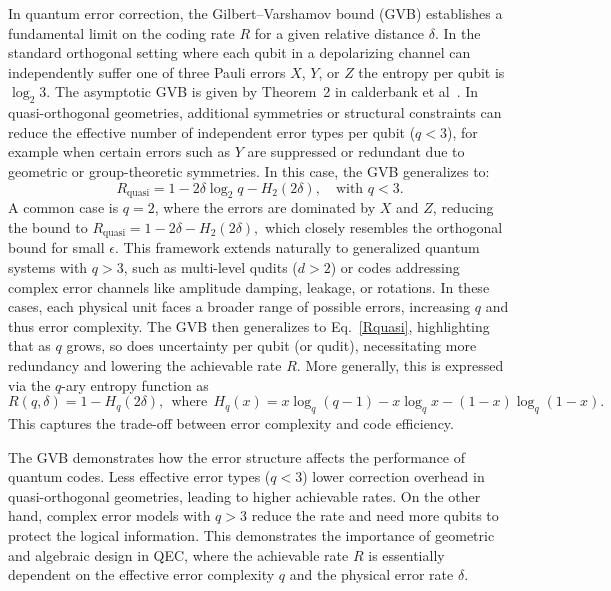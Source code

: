 \documentclass{iopjournal}
\theoremstyle{thmstyleone}%
\theoremstyle{thmstyletwo}%
\theoremstyle{thmstylethree}%
\begin{document}
In quantum error correction, the Gilbert–Varshamov bound (GVB) establishes a fundamental limit on the coding rate \(R\) for a given relative distance \(\delta\). In the standard orthogonal setting where each qubit in a depolarizing channel can independently suffer one of three Pauli errors \(X\), \(Y\), or \(Z\) the entropy per qubit is \(\log_2 3\). The asymptotic GVB is given by Theorem~2 in calderbank et al~\cite{Calderbank1997quantum}. %
In quasi-orthogonal geometries, additional symmetries or structural constraints can reduce the effective number of independent error types per qubit (\(q < 3\)), for example when certain errors such as \(Y\) are suppressed or redundant due to geometric or group-theoretic symmetries.
In this case, the GVB generalizes to:
\begin{equation}
R_{\text{quasi}} = 1 - 2\delta \log_2 q - H_2(2\delta), \quad \text{with } q < 3.\label{Rquasi}
\end{equation}
A common case is \( q = 2 \), where the errors are dominated by \( X \) and \( Z \), reducing the bound to
\(
R_{\text{quasi}} = 1 - 2\delta - H_2(2\delta),
\)
which closely resembles the orthogonal bound for small \(\epsilon\). This framework extends naturally to generalized quantum systems with \( q > 3 \), such as multi-level qudits (\( d > 2 \)) or codes addressing complex error channels like amplitude damping, leakage, or rotations. In these cases, each physical unit faces a broader range of possible errors, increasing \( q \) and thus error complexity. The GVB then generalizes to Eq.~\eqref{Rquasi},
highlighting that as \( q \) grows, so does uncertainty per qubit (or qudit), necessitating more redundancy and lowering the achievable rate \( R \). More generally, this is expressed via the \( q \)-ary entropy function as  
\begin{equation}
R(q,\delta) = 1 - H_q(2\delta),~~ \text{where} ~~H_q(x) = x \log_q (q-1) - x \log_q x - (1-x) \log_q (1-x).\label{R quasi generalised}
\end{equation}
This captures the trade-off between error complexity and code efficiency.

 The GVB demonstrates how the error structure affects the performance of quantum codes.  Less effective error types (\( q < 3 \)) lower correction overhead in quasi-orthogonal geometries, leading to higher achievable rates.  On the other hand, complex error models with \( q > 3 \) reduce the rate and need more qubits to protect  the logical information.  This demonstrates the importance of geometric and algebraic design in QEC, where the achievable rate \( R \) is essentially dependent on the effective error complexity \( q \) and the physical error rate \( \delta \).
 
\end{document}
